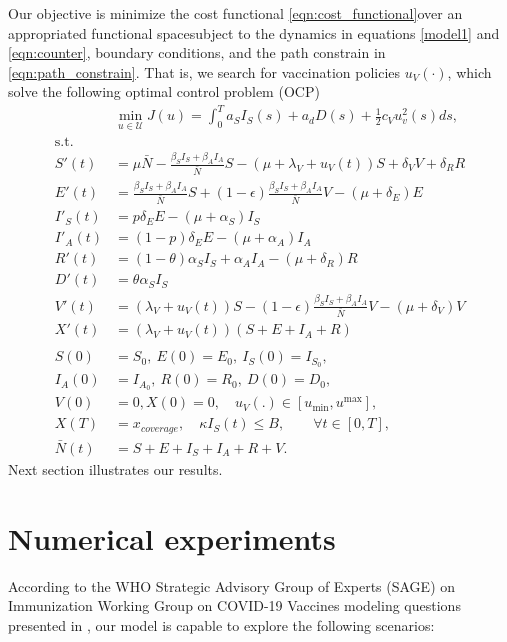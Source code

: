 \documentclass[preprint, sort&compress]{elsarticle}
\begin{document}
    Our objective is minimize the cost functional
  \eqref{eqn:cost_functional}\textemdash over an appropriated functional
  space\textemdash subject to the dynamics in equations \eqref{model1} and \eqref{eqn:counter},
  boundary conditions, and the path constrain in \eqref{eqn:path_constrain}.
  That is, we search for vaccination policies $u_V(\cdot)$, which
  solve the following optimal control problem (OCP)
  \begin{equation}
    \label{eqn:optimal_control_problem}
    \begin{aligned}
      & \min_{u \in \mathcal U}
        J(u) =
        \int_0 ^ T
          a_S I_S(s) + a_d D(s) +
          \frac{1}{2}
c_V u_v^2(s)
ds,
      \\
      \text{s.t.} &
      \\
      S'(t)
        &=
          \mu \bar{N}-\frac{\beta_S
          I_S+\beta_AI_A}{\bar{N}}S -
          (\mu + \lambda_V + u_V(t))S + \delta_V V + \delta_R R
        \\
      E'(t)
        &=
          \frac{\beta_S I_S+\beta_AI_A}{\bar{N}}S+(1-\epsilon) \frac{\beta_S I_S+\beta_AI_A}{\bar{N}}V
          -(\mu+\delta_E) E
        \\
      I'_S(t)
        &=p
          \delta_E
          E-(\mu + \alpha_S) I_S
        \\
      I'_A(t)
        &= (1 - p) \delta_E E-(\mu + \alpha_A) I_A
        \\
      R'(t)
        &= (1 - \theta) \alpha_S I_S + \alpha_A I_A
           - (\mu + \delta_R) R
        \\
      D'(t)&=
        \theta \alpha_S I_S
        \\
      V'(t)&=
        (\lambda_V + u_V(t)) S - (1 -\epsilon)
        \frac{\beta_S I_S + \beta_AI_A}{\bar{N}} V
        -(\mu + \delta_V) V
        \\
      X'(t)&=
        (\lambda_V + u_V(t))(S + E + I_A + R)
      \\
      \\
       S(0) &= S_0, \ E(0) = E_0, \ I_S(0) = I_{S_{0}},
      \\
      I_A(0) &= I_{A_{0}}, \ R(0) = R_0, \ D(0) = D_0,
      \\
      V(0) &= 0, X(0) = 0, \quad
      u_V(.) \in [u_{\min}, u^{\max}],
      \\
      X(T) &= x_{coverage},
      \quad
       \kappa I_S(t) \leq B, \qquad \forall t \in [0, T],
      \\
      \bar{N}(t) &= S + E + I_S + I_A + R + V.
    \end{aligned}
  \end{equation}
Next section illustrates our results. 	\section{Numerical experiments}
		According to the WHO Strategic Advisory Group of Experts (SAGE) on
Immunization Working Group on COVID-19 Vaccines modeling questions
presented in \cite{sage2020}, our model is capable to explore the following scenarios:
\end{document}
